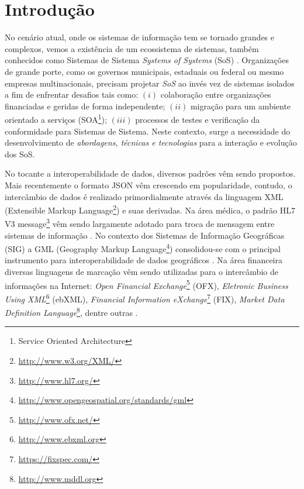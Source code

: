 \documentclass[msc,proposal,hidelot,hideabstract]{ppgccufmg} %
\begin{document}
\chapter{Introdução}
\label{ch:Contexto}
No cenário atual, onde os sistemas de informação tem se tornado grandes e
complexos, vemos a existência de um ecossistema de sistemas, também conhecidos
como Sistemas de Sistema \textit{Systems of Systems} (SoS)
\cite{Nakagawa:2013:SAF:2489850.2489853}. Organizações de grande porte, como os
governos municipais, estaduais ou federal ou mesmo empresas multinacionais,
precisam projetar \textit{SoS} ao invés vez de sistemas isolados a fim de enfrentar desafios tais como: $(i)$ colaboração entre organizações financiadas e geridas de forma independente; $(ii)$ migração para um ambiente orientado a serviços (SOA\footnote{Service Oriented Architecture }); $(iii)$ processos de testes e verificação da conformidade para Sistemas de Sistema. Neste contexto, surge a necessidade do desenvolvimento de \textit{abordagens, técnicas e tecnologias} para a interação e evolução dos SoS.

No tocante a interoperabilidade de dados, diversos padrões vêm sendo
propostos. Mais recentemente o formato JSON \cite{RFC4627} vêm crescendo em
popularidade, contudo, o intercâmbio de dados é realizado primordialmente
através da linguagem XML (Extensible Markup
Language\footnote{\url{http://www.w3.org/XML/}}) e suas derivadas. Na área
médica, o padrão HL7 V3 message\footnote{\url{http://www.hl7.org/}} vêm sendo
largamente adotado para troca de mensagem entre sistemas de informação \cite{Andrikopoulos:2013:TEO:2491845.2491890}{}. No contexto dos Sistemas de Informação Geográficas (SIG) a GML (Geography Markup Language\footnote{\url{http://www.opengeospatial.org/standards/gml}}) consolidou-se com o principal instrumento para interoperabilidade de dados geográficos \cite{gmlpaper}{}. Na área financeira diversas linguagens de marcação vêm sendo utilizadas para o intercâmbio de informações na Internet: \textit{Open Financial Exchange}\footnote{\url{http://www.ofx.net/}} (OFX), \textit{Eletronic Business Using XML}\footnote{\url{http://www.ebxml.org}} (ebXML), \textit{Financial Information eXchange}\footnote{\url{https://fixspec.com/}} (FIX), \textit{Market Data Definition Language}\footnote{\url{http://www.mddl.org}}, dentre outras \cite{xbrl_conceitos_aplicacoes}{}.
\end{document}
